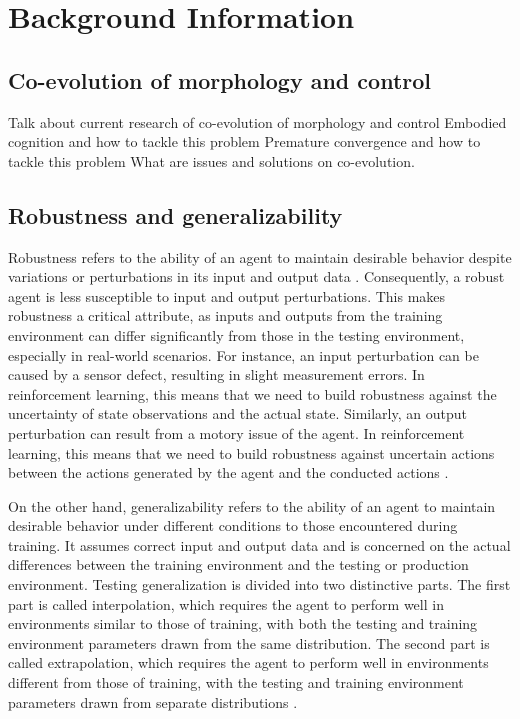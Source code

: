 \section{Background Information}
\subsection{Co-evolution of morphology and control}
Talk about current research of co-evolution of morphology and control
Embodied cognition and how to tackle this problem
Premature convergence and how to tackle this problem
What are issues and solutions on co-evolution.

\subsection{Robustness and generalizability}
Robustness refers to the ability of an agent to maintain desirable behavior despite variations or perturbations in its input and output data \cite{Ravi_Mangal_2019, Charles_Packer_2019, Xu_Mengdi_2022}. Consequently, a robust agent is less susceptible to input and output perturbations. This makes robustness a critical attribute, as inputs and outputs from the training environment can differ significantly from those in the testing environment, especially in real-world scenarios. For instance, an input perturbation can be caused by a sensor defect, resulting in slight measurement errors. In reinforcement learning, this means that we need to build robustness against the uncertainty of state observations and the actual state. Similarly, an output perturbation can result from a motory issue of the agent. In reinforcement learning, this means that we need to build robustness against uncertain actions between the actions generated by the agent and the conducted actions \cite{Xu_Mengdi_2022}. 

On the other hand, generalizability refers to the ability of an agent to maintain desirable behavior under different conditions to those encountered during training. It assumes correct input and output data and is concerned on the actual differences between the training environment and the testing or production environment. Testing generalization is divided into two distinctive parts. The first part is called interpolation, which requires the agent to perform well in environments similar to those of training, with both the testing and training environment parameters drawn from the same distribution. The second part is called extrapolation, which requires the agent to perform well in environments different from those of training, with the testing and training environment parameters drawn from separate distributions \cite{Charles_Packer_2019, Xu_Mengdi_2022}.

